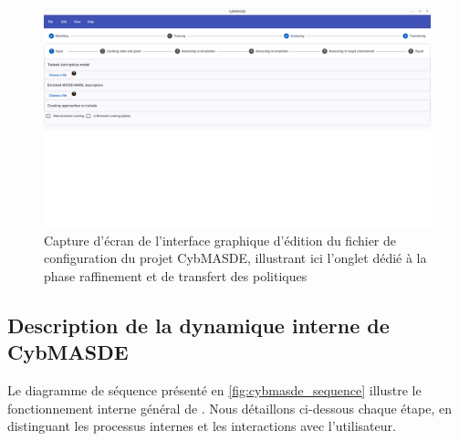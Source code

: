 \begin{figure}[h!]
  \centering
  \includegraphics[trim=0cm 15cm 0cm 0cm, clip,width=\linewidth]{figures/refining.png}
  \caption{Capture d'écran de l'interface graphique d'édition du fichier de configuration du projet CybMASDE, illustrant ici l'onglet dédié à la phase raffinement et de transfert des politiques}
  \label{fig:cybmasde_refining_screenshot}
\end{figure}


\subsection{Description de la dynamique interne de CybMASDE}

Le diagramme de séquence présenté en \autoref{fig:cybmasde_sequence} illustre le fonctionnement interne général de .
Nous détaillons ci-dessous chaque étape, en distinguant les processus internes et les interactions avec l’utilisateur.

